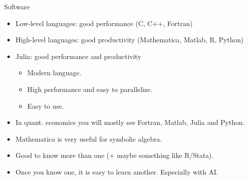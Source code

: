 \documentclass[11pt,xcolor={dvipsnames},aspectratio=159,hyperref={pdftex,pdfpagemode=UseNone,hidelinks,pdfdisplaydoctitle=true},usepdftitle=false]{beamer}
\begin{document}
\begin{frame}{Software}
    \begin{itemize}
        \item Low-level languages: good performance (C, C++, Fortran)
        \item High-level languages: good productivity (Mathematica, Matlab, R, Python)
        \item Julia: good performance and productivity
        \begin{itemize}
            \item Modern language.
            \item High performance and easy to parallelize.
            \item Easy to use.
        \end{itemize}
        \item In quant. economics you will mostly see Fortran, Matlab, Julia and Python.
        \item Mathematica is very useful for symbolic algebra.
        \item Good to know more than one (+ maybe something like R/Stata).
        \item Once you know one, it is easy to learn another. Especially with AI. 
    \end{itemize}   
\end{frame}
\end{document}
